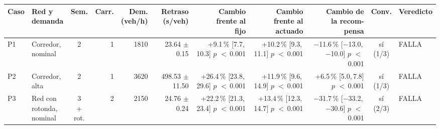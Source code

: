 \begin{table}[H]
\centering
\scriptsize
\setlength{\tabcolsep}{1.5pt}
\begin{tabular}{llcrrrrrrcl}
\toprule
Caso & \makecell[l]{Red y\\demanda} & Sem. & Carr. & \makecell{Dem.\\(veh/h)} & \makecell{Retraso\\(s/veh)} & \makecell{Cambio\\frente al\\fijo} & \makecell{Cambio\\frente al\\actuado} & \makecell{Cambio de\\la recom-\\pensa} & Conv. & Veredicto \\
\midrule
P1 & \makecell[l]{Corredor,\\{}nominal} & 2 & 1 & 1810 & \makecell[r]{23.64\\{}$\pm$ 0.15} & \makecell[r]{+9.1\,\%\\{}[7.7,\,10.3]\\$p$ $<$\,0.001} & \makecell[r]{+10.2\,\%\\{}[9.3,\,11.1]\\$p$ $<$\,0.001} & \makecell[r]{$-$11.6\,\%\\{}[$-$13.0,\,$-$10.0]\\$p$ $<$\,0.001} & \makecell[c]{sí\\{}(1/3)} & FALLA \\
P2 & \makecell[l]{Corredor,\\{}alta} & 2 & 1 & 3620 & \makecell[r]{498.53\\{}$\pm$ 11.50} & \makecell[r]{+26.4\,\%\\{}[23.8,\,29.6]\\$p$ $<$\,0.001} & \makecell[r]{+11.9\,\%\\{}[9.6,\,14.9]\\$p$ $<$\,0.001} & \makecell[r]{+6.5\,\%\\{}[5.0,\,7.8]\\$p$ $<$\,0.001} & \makecell[c]{sí\\{}(1/3)} & FALLA \\
P3 & \makecell[l]{Red con\\{}rotonda,\\{}nominal} & \makecell[c]{3\\{}+ rot.} & 2 & 2150 & \makecell[r]{24.76\\{}$\pm$ 0.24} & \makecell[r]{+22.2\,\%\\{}[21.3,\,23.4]\\$p$ $<$\,0.001} & \makecell[r]{+13.4\,\%\\{}[12.3,\,14.7]\\$p$ $<$\,0.001} & \makecell[r]{$-$31.7\,\%\\{}[$-$33.2,\,$-$30.6]\\$p$ $<$\,0.001} & \makecell[c]{sí\\{}(2/3)} & FALLA \\

\end{tabular}
\end{table}
